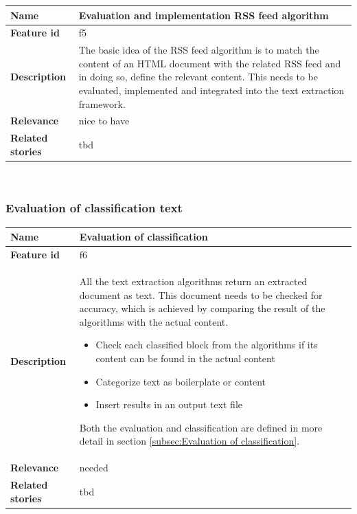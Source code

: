 \begin{tabular}{ | p{3cm} | p{12cm} |}
	\hline
	\textbf{Name} 				& Evaluation and implementation RSS feed algorithm \\ \hline
	\textbf{Feature id} 		& f5 \\ \hline
	\textbf{Description} 		& The basic idea of the RSS feed algorithm is to match the content of an HTML document with the related RSS feed and in doing so, define the relevant content. This needs to be evaluated, implemented and integrated into the text extraction framework.  \\ \hline
	\textbf{Relevance} 			& nice to have\\ \hline
	\textbf{Related stories} 	& tbd \\ \hline
	\end{tabular} \\

\subsubsection{Evaluation of classification text}
\label{subsec:Evaluation of classification text}

	\begin{tabular}{ | p{3cm} | p{12cm} |}
	\hline
	\textbf{Name} 				& Evaluation of classification \\ \hline
	\textbf{Feature id} 		& f6 \\ \hline
	\textbf{Description} 		& All the text extraction algorithms return an extracted document as text. This document needs to be checked for accuracy, which is achieved by comparing the result of the algorithms with the actual content. 
								\begin{itemize}
							        \item Check each classified block from the algorithms if its content can be found in the actual content
							        \item Categorize text as boilerplate or content
							        \item Insert results in an output text file
						        \end{itemize} 

						        Both the evaluation and classification are defined in more detail in section \ref{subsec:Evaluation of classification}.
						        \\ \hline

	\textbf{Relevance} 			& needed\\ \hline
	\textbf{Related stories} 	& tbd \\ \hline
	\end{tabular} \\


